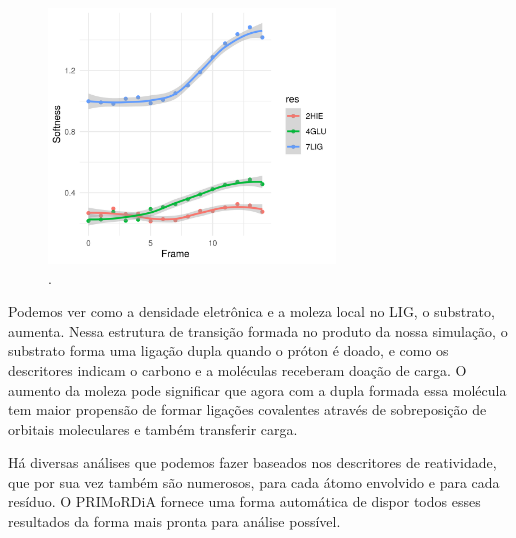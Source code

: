 \documentclass[a4paper,11pt]{refart}
\begin{document}
\hspace*{-\leftmarginwidth}
\begin{minipage}{\fullwidth}
	\begin{figure}[H]
		\begin{center}
			\includegraphics[width=3in]{images/tut6_img16}
			\caption{.}
			\label{fig_tut6_15}
		\end{center}
	\end{figure}
\end{minipage}

Podemos ver como a densidade eletrônica e a moleza local no LIG, o substrato, aumenta. Nessa estrutura de transição formada no produto da nossa simulação, o substrato forma uma ligação dupla quando o próton é doado, e como os descritores indicam o carbono e a moléculas receberam doação de carga. O aumento da moleza pode significar que agora com a dupla formada essa molécula tem maior propensão de formar ligações covalentes através de sobreposição de orbitais moleculares e também transferir carga. 

Há diversas análises que podemos fazer baseados nos descritores de reatividade, que por sua vez também são numerosos, para cada átomo envolvido e para cada resíduo. O PRIMoRDiA fornece uma forma automática de dispor todos esses resultados da forma mais pronta para análise possível. 
\end{document}
